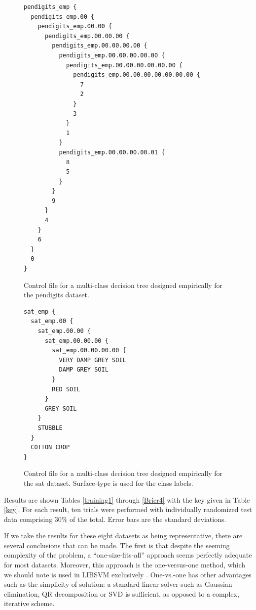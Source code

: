 \begin{figure}[htp]
	\begin{boxedminipage}{\textwidth}
		\begin{small}
		\begin{verbatim}
pendigits_emp {
  pendigits_emp.00 {
    pendigits_emp.00.00 {
      pendigits_emp.00.00.00 {
        pendigits_emp.00.00.00.00 {
          pendigits_emp.00.00.00.00.00 {
            pendigits_emp.00.00.00.00.00.00 {
              pendigits_emp.00.00.00.00.00.00.00 {
                7
                2
              }
              3
            }
            1
          }
          pendigits_emp.00.00.00.00.01 {
            8
            5
          }
        }
        9
      }
      4
    }
    6
  }
  0
}
		\end{verbatim}
		\end{small}
	\end{boxedminipage}
	\caption{Control file for a multi-class decision tree designed empirically for the pendigits dataset.}
	\label{pendigits}
\end{figure}

\begin{figure}[htp]
	\begin{boxedminipage}{\textwidth}
		\begin{small}
		\begin{verbatim}
sat_emp {
  sat_emp.00 {
    sat_emp.00.00 {
      sat_emp.00.00.00 {
        sat_emp.00.00.00.00 {
          VERY DAMP GREY SOIL
          DAMP GREY SOIL
        }
        RED SOIL
      }
      GREY SOIL
    }
    STUBBLE
  }
  COTTON CROP
}
		\end{verbatim}
		\end{small}
	\end{boxedminipage}
	\caption{Control file for a multi-class decision tree designed empirically for the sat dataset. Surface-type is used for the class labels.}
	\label{sat}
\end{figure}


Results are shown Tables \ref{training1} through \ref{Brier4} with the
key given in Table \ref{key}.
For each result, ten trials were performed with individually randomized 
test data comprising 30\% of the total.
Error bars are the standard deviations.

If we take the results for these eight datasets as being representative,
there are several conclusions that can be made.
The first is that despite the seeming complexity of the problem, a 
``one-size-fits-all'' approach seems perfectly adequate for most datasets.
Moreover, this approach is the one-versus-one method,
which we should note is used in LIBSVM exclusively \citep{Chang_Lin2011}.
One-vs.-one has other advantages such as the simplicity of solution:
a standard linear solver such as Gaussian elimination,
QR decomposition or SVD is sufficient,
as opposed to a complex, iterative scheme.

